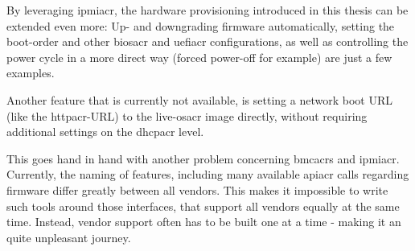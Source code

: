 By leveraging \gls{ipmiacr}, the hardware provisioning introduced in this thesis can be extended even more: Up- and downgrading firmware automatically, setting the boot-order and other \gls{biosacr} and \gls{uefiacr} configurations, as well as controlling the power cycle in a more direct way (forced power-off for example) are just a few examples. 

Another feature that is currently not available, is setting a network boot URL (like the \gls{httpacr}-URL) to the live-\gls{osacr} image directly, without requiring additional settings on the \gls{dhcpacr} level.

This goes hand in hand with another problem concerning \gls{bmcacr}s and \gls{ipmiacr}. Currently, the naming of features, including many available \gls{apiacr} calls regarding firmware differ greatly between all vendors. This makes it impossible to write such tools around those interfaces, that support all vendors equally at the same time. Instead, vendor support often has to be built one at a time - making it an quite unpleasant journey.





